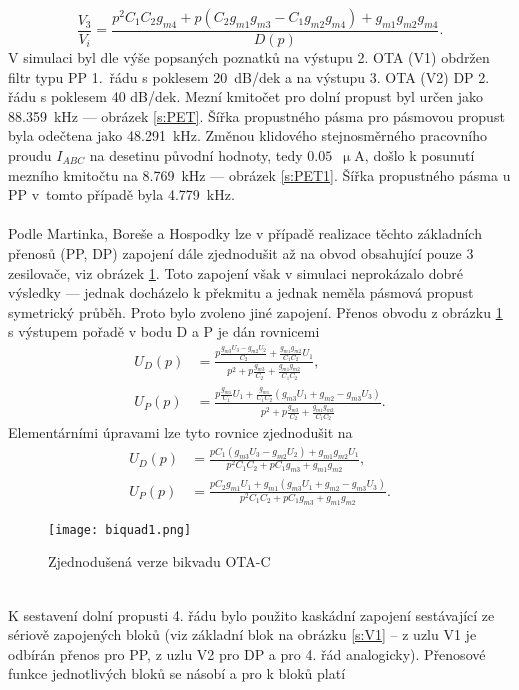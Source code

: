 \begin{equation}
\frac{V_3}{V_i} = \frac{p^2C_1C_2g_{m4} + p(C_2g_{m1}g_{m3} - C_1g_{m2}g_{m4}) + g_{m1}g_{m2}g_{m4}}{D(p)}.
\end{equation}
\noindent 
V simulaci byl dle výše popsaných poznatků na výstupu 2. OTA (V1) obdržen filtr typu PP 1.~řádu s poklesem 20~dB/dek a na výstupu 3. OTA (V2) DP 2. řádu s poklesem 40 dB/dek. Mezní kmitočet pro dolní propust byl určen jako 88.359~kHz --- obrázek \ref{s:PET}. Šířka propustného pásma pro pásmovou propust byla odečtena jako 48.291~kHz. Změnou klidového stejnosměrného pracovního proudu $I_{ABC}$ na desetinu původní hodnoty, tedy $0.05$~$\upmu$A, došlo k posunutí mezního kmitočtu na 8.769~kHz --- obrázek \ref{s:PET1}. Šířka propustného pásma u PP v~tomto případě byla 4.779~kHz.\\
\\
\noindent Podle Martinka, Boreše a Hospodky \cite{12} lze v případě realizace těchto základních přenosů (PP, DP) zapojení dále zjednodušit až na obvod obsahující pouze 3 zesilovače, viz obrázek \ref{s:BIK2}. Toto zapojení však v simulaci neprokázalo dobré výsledky --- jednak docházelo k překmitu a jednak neměla pásmová propust symetrický průběh. Proto bylo zvoleno jiné zapojení. Přenos obvodu z obrázku \ref{s:BIK2} s výstupem pořadě v bodu D a P je dán rovnicemi
\begin{align}
U_D(p) &= \frac{p\frac{g_{m3}U_3-g_{m2}U_2}{C_2}+\frac{g_{m1}g_{m2}}{C_1C_2}U_1}{p^2 + p\frac{g_{m3}}{C_2} + \frac{g_{m1}g_{m2}}{C_1C_2}},\\
U_P(p) &= \frac{p\frac{g_{m1}}{C_1}U_1 + \frac{g_{m1}}{C_1C_2}(g_{m3}U_1+g_{m2}-g_{m3}U_3)}{p^2 + p\frac{g_{m3}}{C_2} + \frac{g_{m1}g_{m2}}{C_1C_2}}.
\end{align}
\noindent Elementárními úpravami lze tyto rovnice zjednodušit na
\begin{align}
U_D(p) &= \frac{pC_1(g_{m3}U_3 - g_{m2}U_2) + g_{m1}g_{m2}U_1}{p^2C_1C_2 + pC_1g_{m3} + g_{m1}g_{m2}},\\
U_P(p) &= \frac{pC_2g_{m1}U_1 + g_{m1}(g_{m3}U_1 + g_{m2} - g_{m3}U_3)}{p^2C_1C_2 + pC_1g_{m3} + g_{m1}g_{m2}}.
\end{align}
\begin{figure}[h]
\centering
\texttt{[image: biquad1.png]}
\caption[Zjednodušená verze bikvadu OTA-C]{Zjednodušená verze bikvadu OTA-C \label{s:BIK2}}
\end{figure}
\\
\noindent K sestavení dolní propusti 4. řádu bylo použito kaskádní zapojení sestávající ze sériově zapojených bloků (viz základní blok na obrázku \ref{s:V1} -- z uzlu V1 je odbírán přenos pro PP, z uzlu V2 pro DP a pro 4. řád analogicky). Přenosové funkce jednotlivých bloků se násobí a pro k bloků platí
